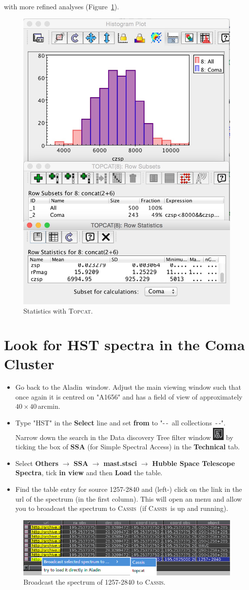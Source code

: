 \documentclass [a4paper, 12pt]{article}
\newcommand{\aladin}{{\textsc{A}{ladin}}}
\newcommand{\topcat}{{\textsc{Topcat}}}
\newcommand{\cassis}{{\textsc{Cassis}}}
\begin{document}
\begin{itemize}
with more refined analyses (Figure~\ref{fig:topstats}). 
\begin{figure}[H]
\center
\includegraphics[width=0.33  \textwidth]{../images/topcat_hist-stat_coma.jpg}
\caption{Statistics with \topcat.}
\label{fig:topstats}
\end{figure}
\end{itemize}

\section{Look for HST spectra in the Coma Cluster}

\begin{itemize}
\item Go back to the \aladin\ window. Adjust the main viewing window such that 
once again it is centred on "A1656" and has a field of view of approximately 
$40\times40$\,arcmin. 
\item Type "HST" in the \textbf{Select} line and set \textbf{from} to "-\,-~all 
collections~-\,-". Narrow down the search in the Data discovery Tree filter 
window \includegraphics[width=0.03 
\textwidth]{../images/aladin_button_filtertree.png} by ticking the box of 
\textbf{SSA} (for Simple Spectral Access) in the \textbf{Technical} tab. 
\item Select \textbf{Others} $\rightarrow$ \textbf{SSA} $\rightarrow$ 
\textbf{mast.stsci} $\rightarrow$ \textbf{Hubble Space Telescope Spectra}, tick 
\textbf{in view} and then \textbf{Load} the table. 
\item Find the table entry for source 1257-2840 and (left-) click on the link 
in the url of the spectrum (in the first column). This will open an menu and 
allow you to broadcast the spectrum to \cassis\ (if \cassis\ is up and 
running). 
\end{itemize}
\begin{figure}[H]
    \center
    \includegraphics[width=0.6  
    \textwidth]{../images/aladin_send_HSTspec_cassis.png}
    \caption{Broadcast the spectrum of 1257-2840 to \cassis.}
    \label{fig:broadcastspectrum}
\end{figure}
\end{document}

